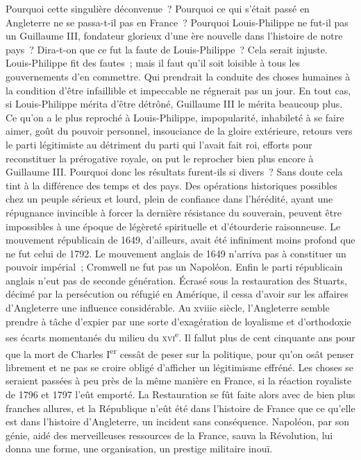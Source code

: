 \documentclass[french,twoside]{book} %
\begin{document}
Pourquoi cette singulière déconvenue ? Pourquoi ce qui s’était passé en Angleterre ne se passa-t-il pas en France ? Pourquoi Louis-Philippe ne fut-il pas un Guillaume III, fondateur glorieux d’une ère nouvelle dans l’histoire de notre pays ? Dira-t-on que ce fut la faute de Louis-Philippe ? Cela serait injuste. Louis-Philippe fit des fautes ; mais il faut qu’il soit loisible à tous les gouvernements d’en commettre. Qui prendrait la conduite des choses humaines à la condition d’être infaillible et impeccable ne régnerait pas un jour. En tout cas, si Louis-Philippe mérita d’être détrôné, Guillaume III le mérita beaucoup plus. Ce qu’on a le plus reproché à Louis-Philippe, impopularité, inhabileté à se faire aimer, goût du pouvoir personnel, insouciance de la gloire extérieure, retours vers le parti légitimiste au détriment du parti qui l’avait fait roi, efforts pour reconstituer la prérogative royale, on put le reprocher bien plus encore à Guillaume III. Pourquoi donc les résultats furent-ils si divers ? Sans doute cela tint à la différence des temps et des pays. Des opérations historiques possibles chez un peuple sérieux et lourd, plein de confiance dans l’hérédité, ayant une répugnance invincible à forcer la dernière résistance du souverain, peuvent être impossibles à une époque de légèreté spirituelle et d’étourderie raisonneuse. Le mouvement républicain de 1649, d’ailleurs, avait été infiniment moins profond que ne fut celui de 1792. Le mouvement anglais de 1649 n’arriva pas à constituer un pouvoir impérial ; Cromwell ne fut pas un Napoléon. Enfin le parti républicain anglais n’eut pas de seconde génération. Écrasé sous la restauration des Stuarts, décimé par la persécution ou réfugié en Amérique, il cessa d’avoir sur les affaires d’Angleterre une influence considérable. Au xviiie siècle, l’Angleterre semble prendre à tâche d’expier par une sorte d’exagération de loyalisme et d’orthodoxie ses écarts momentanés du milieu du \textsc{xvi}\textsuperscript{e}. Il fallut plus de cent cinquante ans pour que la mort de Charles I\textsuperscript{er} cessât de peser sur la politique, pour qu’on osât penser librement et ne pas se croire obligé d’afficher un légitimisme effréné. Les choses se seraient passées à peu près de la même manière en France, si la réaction royaliste de 1796 et 1797 l’eût emporté. La Restauration se fût faite alors avec de bien plus franches allures, et la République n’eût été dans l’histoire de France que ce qu’elle est dans l’histoire d’Angleterre, un incident sans conséquence. Napoléon, par son génie, aidé des merveilleuses ressources de la France, sauva la Révolution, lui donna une forme, une organisation, un prestige militaire inouï.\par
\end{document}
